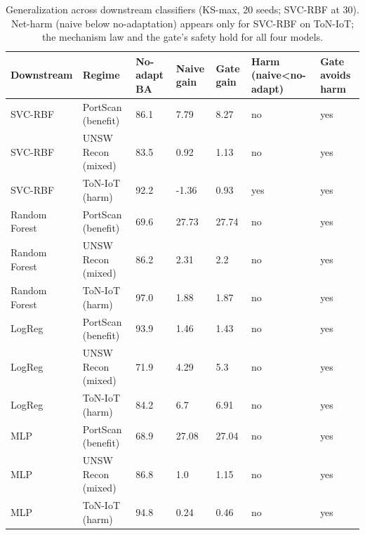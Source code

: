 \begin{table}[t]
\centering
\caption{Generalization across downstream classifiers (KS-max, 20 seeds; SVC-RBF at 30). Net-harm (naive below no-adaptation) appears only for SVC-RBF on ToN-IoT; the mechanism law and the gate's safety hold for all four models.}
\label{tab:table6_downstream_generalization}
\small
\begin{tabular}{lllllll}
\toprule
Downstream & Regime & No-adapt BA & Naive gain & Gate gain & Harm (naive<no-adapt) & Gate avoids harm \\
\midrule
SVC-RBF & PortScan (benefit) & 86.1 & 7.79 & 8.27 & no & yes \\
SVC-RBF & UNSW Recon (mixed) & 83.5 & 0.92 & 1.13 & no & yes \\
SVC-RBF & ToN-IoT (harm) & 92.2 & -1.36 & 0.93 & yes & yes \\
Random Forest & PortScan (benefit) & 69.6 & 27.73 & 27.74 & no & yes \\
Random Forest & UNSW Recon (mixed) & 86.2 & 2.31 & 2.2 & no & yes \\
Random Forest & ToN-IoT (harm) & 97.0 & 1.88 & 1.87 & no & yes \\
LogReg & PortScan (benefit) & 93.9 & 1.46 & 1.43 & no & yes \\
LogReg & UNSW Recon (mixed) & 71.9 & 4.29 & 5.3 & no & yes \\
LogReg & ToN-IoT (harm) & 84.2 & 6.7 & 6.91 & no & yes \\
MLP & PortScan (benefit) & 68.9 & 27.08 & 27.04 & no & yes \\
MLP & UNSW Recon (mixed) & 86.8 & 1.0 & 1.15 & no & yes \\
MLP & ToN-IoT (harm) & 94.8 & 0.24 & 0.46 & no & yes \\
\bottomrule
\end{tabular}
\end{table}
